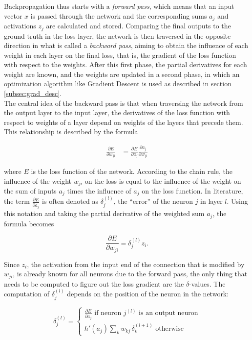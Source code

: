 \noindent Backpropagation thus starts with a \textit{forward pass}, which means that an input vector $x$ is passed through the network and the corresponding sums $a_j$ and activations $z_j$ are calculated and stored. Comparing the final outputs to the ground truth in the loss layer, the network is then traversed in the opposite direction in what is called a \textit{backward pass}, aiming to obtain the influence of each weight in each layer on the final loss, that is, the gradient of the loss function with respect to the weights. After this first phase, the partial derivatives for each weight are known, and the weights are updated in a second phase, in which an optimization algorithm like Gradient Descent is used as described in section \ref{subsec:grad_desc}.\\

\noindent The central idea of the backward pass is that when traversing the network from the output layer to the input layer, the derivatives of the loss function with respect to weights of a layer depend on weights of the layers that precede them. This relationship is described by the formula

\begin {align}
	\frac{\partial E}{\partial w_{ji}} &= \frac{\partial E}{\partial a_j} \frac{\partial a_j}{\partial w_{ji}}
\end {align}

\noindent where $E$ is the loss function of the network. According to the chain rule, the influence of the weight $w_{ji}$ on the loss is equal to the influence of the weight on the sum of inputs $a_j$ times the influence of $a_j$ on the loss function. In literature, the term $\frac{\partial E}{\partial a_j}$ is often denoted as $\delta_j^{(l)}$, the ``error'' of the neuron $j$ in layer $l$. Using this notation and taking the partial derivative of the weighted sum $a_j$, the formula becomes

\[ \frac{\partial E}{\partial w_{ji}} = \delta_j^{(l)} z_i .\]

\noindent Since $z_i$, the activation from the input end of the connection that is modified by $w_{ji}$, is already known for all neurons due to the forward pass, the only thing that needs to be computed to figure out the loss gradient are the $\delta$-values. The computation of $\delta_j^{(l)}$ depends on the position of the neuron in the network:

\[ \delta_j^{(l)} =  \begin{cases}
				\frac{\partial E}{\partial a_j} \text{ if neuron } j^{(l)} \text{ is an output neuron} \\
			           h'(a_j) \sum \limits_{k} w_{kj} \, \delta_k^{(l+1)} \text{ otherwise}
			     \end{cases}
\]

